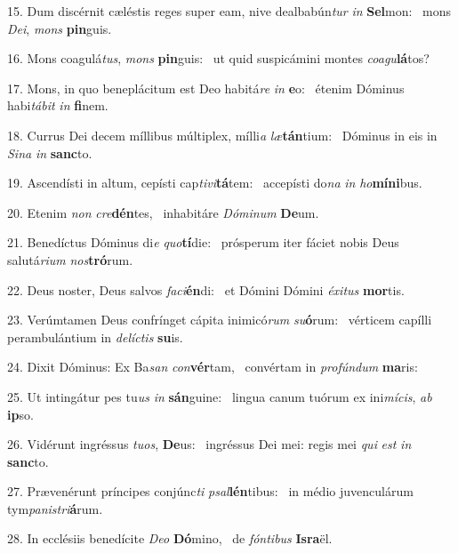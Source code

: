 15. Dum discérnit cæléstis reges super eam, nive dealbabún\textit{tur} \textit{in} \textbf{Sel}mon: \ast\  mons \textit{De}\textit{i}, \textit{mons} \textbf{pin}guis.\

16. Mons coagulá\textit{tus}, \textit{mons} \textbf{pin}guis: \ast\  ut quid suspicámini montes \textit{co}\textit{a}\textit{gu}\textbf{lá}tos?\

17. Mons, in quo beneplácitum est Deo habitá\textit{re} \textit{in} \textbf{e}o: \ast\  étenim Dóminus habi\textit{tá}\textit{bit} \textit{in} \textbf{fi}nem.\

18. Currus Dei decem míllibus múltiplex, mílli\textit{a} \textit{læ}\textbf{tán}tium: \ast\  Dóminus in eis in \textit{Si}\textit{na} \textit{in} \textbf{sanc}to.\

19. Ascendísti in altum, cepísti cap\textit{ti}\textit{vi}\textbf{tá}tem: \ast\  accepísti do\textit{na} \textit{in} \textit{ho}\textbf{mí}\textbf{ni}bus.\

20. Etenim \textit{non} \textit{cre}\textbf{dén}tes, \ast\  inhabitáre \textit{Dó}\textit{mi}\textit{num} \textbf{De}um.\

21. Benedíctus Dóminus di\textit{e} \textit{quo}\textbf{tí}die: \ast\  prósperum iter fáciet nobis Deus salutá\textit{ri}\textit{um} \textit{nos}\textbf{tró}rum.\

22. Deus noster, Deus salvos \textit{fa}\textit{ci}\textbf{én}di: \ast\  et Dómini Dómini \textit{éx}\textit{i}\textit{tus} \textbf{mor}tis.\

23. Verúmtamen Deus confrínget cápita inimicó\textit{rum} \textit{su}\textbf{ó}rum: \ast\  vérticem capílli perambulántium in \textit{de}\textit{líc}\textit{tis} \textbf{su}is.\

24. Dixit Dóminus: Ex Ba\textit{san} \textit{con}\textbf{vér}tam, \ast\  convértam in \textit{pro}\textit{fún}\textit{dum} \textbf{ma}ris:\

25. Ut intingátur pes tu\textit{us} \textit{in} \textbf{sán}guine: \ast\  lingua canum tuórum ex ini\textit{mí}\textit{cis}, \textit{ab} \textbf{ip}so.\

26. Vidérunt ingréssus \textit{tu}\textit{os}, \textbf{De}us: \ast\  ingréssus Dei mei: regis mei \textit{qui} \textit{est} \textit{in} \textbf{sanc}to.\

27. Prævenérunt príncipes conjúnc\textit{ti} \textit{psal}\textbf{lén}tibus: \ast\  in médio juvenculárum tym\textit{pa}\textit{nis}\textit{tri}\textbf{á}rum.\

28. In ecclésiis benedícite \textit{De}\textit{o} \textbf{Dó}mino, \ast\  de \textit{fón}\textit{ti}\textit{bus} \textbf{Is}\textbf{ra}ël.\

